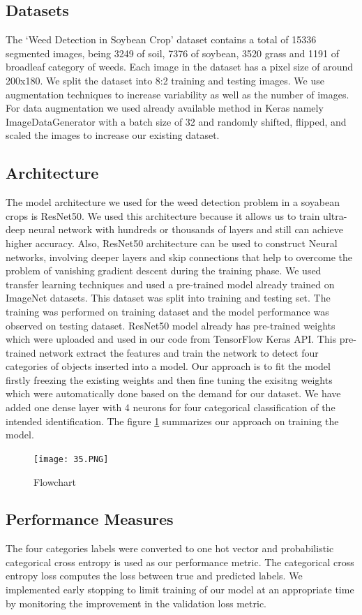 \documentclass{report}
\begin{document}
\subsection{Datasets}
The ‘Weed Detection in Soybean Crop’ dataset contains a total of 15336 segmented images, being 3249 of soil, 7376 of soybean, 3520 grass and 1191 of broadleaf category of weeds. Each image in the dataset has a pixel size of around 200x180. We split the dataset into 8:2 training and testing images. We use augmentation techniques to increase variability as well as the number of images. For data augmentation we used already available method in Keras namely ImageDataGenerator with a batch size of 32 and randomly shifted, flipped, and scaled the images to increase our existing dataset.

\subsection{Architecture}
The model architecture we used for the weed detection problem in a soyabean crops is ResNet50. We used this architecture because it allows us to train ultra-deep neural network with hundreds or thousands of layers and still can achieve higher accuracy. Also, ResNet50 architecture can be used to construct Neural networks, involving deeper layers and skip connections that help to overcome the problem of vanishing gradient descent during the training phase. We used transfer learning techniques and used a pre-trained model already trained on ImageNet datasets. This dataset was split into training and testing set. The training was performed on training dataset and the model performance was observed on testing dataset. ResNet50 model already has pre-trained weights which were uploaded and used in our code from TensorFlow Keras API. This pre-trained network extract the features and train the network to detect four categories of objects inserted into a model. Our approach is to fit the model firstly freezing the existing weights and then fine tuning the exisitng weights which were automatically done based on the demand for our dataset. We have added one dense layer with 4 neurons for four categorical classification of the intended identification. The figure
\ref{fig:Flowchart} summarizes our approach on training the model.
\begin{figure}[H]
\centering
\texttt{[image: 35.PNG]}
\caption{Flowchart}
\label{fig:Flowchart}
\end{figure}

\subsection{Performance Measures}
The four categories labels were converted to one hot vector and probabilistic categorical cross entropy is used as our performance metric. The categorical cross entropy loss computes the loss between true and predicted labels. We implemented early stopping to limit training of our model at an appropriate time by monitoring the improvement in the validation loss metric. 
\end{document}
